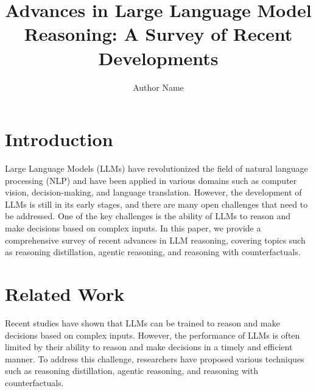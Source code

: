 \documentclass[12pt]{article}
\begin{document}
\title{Advances in Large Language Model Reasoning: A Survey of Recent Developments}

\author{Author Name}

\maketitle


\section{Introduction}

Large Language Models (LLMs) have revolutionized the field of natural language processing (NLP) and have been applied in various domains such as computer vision, decision-making, and language translation. However, the development of LLMs is still in its early stages, and there are many open challenges that need to be addressed. One of the key challenges is the ability of LLMs to reason and make decisions based on complex inputs. In this paper, we provide a comprehensive survey of recent advances in LLM reasoning, covering topics such as reasoning distillation, agentic reasoning, and reasoning with counterfactuals.

\section{Related Work}

Recent studies have shown that LLMs can be trained to reason and make decisions based on complex inputs. However, the performance of LLMs is often limited by their ability to reason and make decisions in a timely and efficient manner. To address this challenge, researchers have proposed various techniques such as reasoning distillation, agentic reasoning, and reasoning with counterfactuals.
\end{document}
